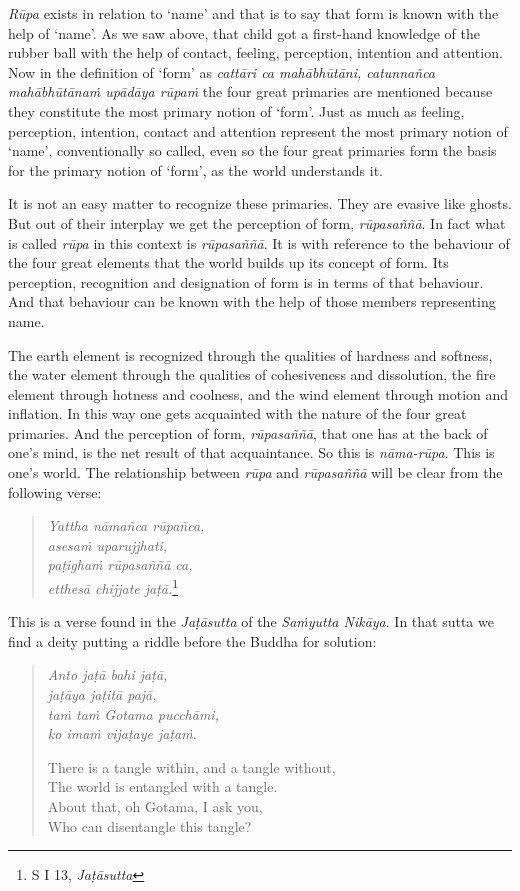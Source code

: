 \emph{Rūpa} exists in relation to `name' and that is to say that form is known with the help of `name'. As we saw above, that child got a first-hand knowledge of the rubber ball with the help of contact, feeling, perception, intention and attention. Now in the definition of `form' as \emph{cattāri ca mahābhūtāni, catunnañca mahābhūtānaṁ upādāya rūpaṁ} the four great primaries are mentioned because they constitute the most primary notion of `form'. Just as much as feeling, perception, intention, contact and attention represent the most primary notion of `name', conventionally so called, even so the four great primaries form the basis for the primary notion of `form', as the world understands it.

It is not an easy matter to recognize these primaries. They are evasive like ghosts. But out of their interplay we get the perception of form, \emph{rūpasaññā}. In fact what is called \emph{rūpa} in this context is \emph{rūpasaññā}. It is with reference to the behaviour of the four great elements that the world builds up its concept of form. Its perception, recognition and designation of form is in terms of that behaviour. And that behaviour can be known with the help of those members representing name.

The earth element is recognized through the qualities of hardness and softness, the water element through the qualities of cohesiveness and dissolution, the fire element through hotness and coolness, and the wind element through motion and inflation. In this way one gets acquainted with the nature of the four great primaries. And the perception of form, \emph{rūpasaññā}, that one has at the back of one's mind, is the net result of that acquaintance. So this is \emph{nāma-rūpa}. This is one's world. The relationship between \emph{rūpa} and \emph{rūpasaññā} will be clear from the following verse:

\begin{quote}
\emph{Yattha nāmañca rūpañca,}\\
\emph{asesaṁ uparujjhati,}\\
\emph{paṭighaṁ rūpasaññā ca,}\\
\emph{etthesā chijjate jaṭā.}\footnote{S I 13, \emph{Jaṭāsutta}}
\end{quote}

This is a verse found in the \emph{Jaṭāsutta} of the \emph{Saṁyutta Nikāya}. In that sutta we find a deity putting a riddle before the Buddha for solution:

\begin{quote}
\emph{Anto jaṭā bahi jaṭā,}\\
\emph{jaṭāya jaṭitā pajā,}\\
\emph{taṁ taṁ Gotama pucchāmi,}\\
\emph{ko imaṁ vijaṭaye jaṭaṁ}.

There is a tangle within, and a tangle without,\\
The world is entangled with a tangle.\\
About that, oh Gotama, I ask you,\\
Who can disentangle this tangle?
\end{quote}

